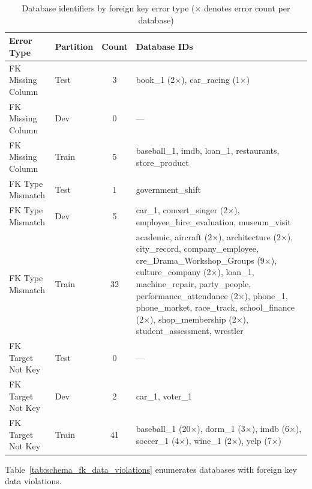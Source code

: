 \documentclass[print]{einformatica}
\begin{document}
\begin{table}[ht]
    \caption{Database identifiers by foreign key error type (× denotes error count per database)}
    \label{tab:schema_dbs_by_error}
    \centering
    \footnotesize
    \begin{tabular}{llcp{}}
        \toprule
        \textbf{Error Type} & \textbf{Partition} & \textbf{Count} & \textbf{Database IDs} \\
        \midrule
        FK Missing Column & Test & 3 & book\_1 (2×), car\_racing (1×) \\
        FK Missing Column & Dev & 0 & --- \\
        FK Missing Column & Train & 5 & baseball\_1, imdb, loan\_1, restaurants, store\_product \\
        \midrule
        FK Type Mismatch & Test & 1 & government\_shift \\
        FK Type Mismatch & Dev & 5 & car\_1, concert\_singer (2×), employee\_hire\_evaluation, museum\_visit \\
        FK Type Mismatch & Train & 32 & academic, aircraft (2×), architecture (2×), city\_record, company\_employee, cre\_Drama\_Workshop\_Groups (9×), culture\_company (2×), loan\_1, machine\_repair, party\_people, performance\_attendance (2×), phone\_1, phone\_market, race\_track, school\_finance (2×), shop\_membership (2×), student\_assessment, wrestler \\
        \midrule
        FK Target Not Key & Test & 0 & --- \\
        FK Target Not Key & Dev & 2 & car\_1, voter\_1 \\
        FK Target Not Key & Train & 41 & baseball\_1 (20×), dorm\_1 (3×), imdb (6×), soccer\_1 (4×), wine\_1 (2×), yelp (7×) \\
        \bottomrule
    \end{tabular}
\end{table}

Table~\ref{tab:schema_fk_data_violations} enumerates databases with foreign key data violations.
\end{document}
